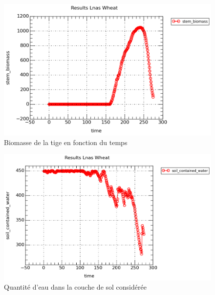 \begin{figure}[h]

\begin{center}
 \includegraphics[scale = 0.5]{./img/stem.png}
 \caption{Biomasse de la tige en fonction du temps}
 \label{fig:resultatStem}
\end{center}

\end{figure}

\begin{figure}[h]

\begin{center}
 \includegraphics[scale = 0.5]{./img/water.png}
 \caption{Quantité d'eau dans la couche de sol considérée}
 \label{fig:resultatWater}
\end{center}
\end{figure}

